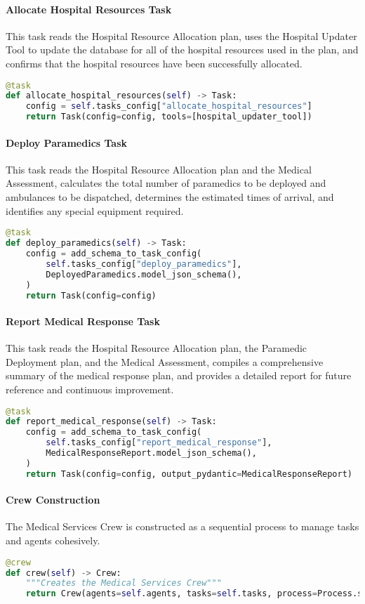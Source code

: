 \paragraph{Allocate Hospital Resources Task}
This task reads the Hospital Resource Allocation plan, uses the Hospital Updater Tool to update the database for all of the hospital resources used in the plan, and confirms that the hospital resources have been successfully allocated.

\begin{lstlisting}[language=Python]
@task
def allocate_hospital_resources(self) -> Task:
    config = self.tasks_config["allocate_hospital_resources"]
    return Task(config=config, tools=[hospital_updater_tool])
\end{lstlisting}

\paragraph{Deploy Paramedics Task}
This task reads the Hospital Resource Allocation plan and the Medical Assessment, calculates the total number of paramedics to be deployed and ambulances to be dispatched, determines the estimated times of arrival, and identifies any special equipment required.

\begin{lstlisting}[language=Python]
@task
def deploy_paramedics(self) -> Task:
    config = add_schema_to_task_config(
        self.tasks_config["deploy_paramedics"],
        DeployedParamedics.model_json_schema(),
    )
    return Task(config=config)
\end{lstlisting}

\paragraph{Report Medical Response Task}
This task reads the Hospital Resource Allocation plan, the Paramedic Deployment plan, and the Medical Assessment, compiles a comprehensive summary of the medical response plan, and provides a detailed report for future reference and continuous improvement.

\begin{lstlisting}[language=Python]
@task
def report_medical_response(self) -> Task:
    config = add_schema_to_task_config(
        self.tasks_config["report_medical_response"],
        MedicalResponseReport.model_json_schema(),
    )
    return Task(config=config, output_pydantic=MedicalResponseReport)
\end{lstlisting}

\paragraph{Crew Construction}
The Medical Services Crew is constructed as a sequential process to manage tasks and agents cohesively.

\begin{lstlisting}[language=Python]
@crew
def crew(self) -> Crew:
    """Creates the Medical Services Crew"""
    return Crew(agents=self.agents, tasks=self.tasks, process=Process.sequential)
\end{lstlisting}